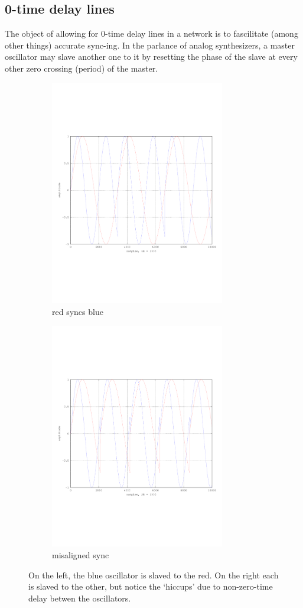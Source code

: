 \documentclass{article}
\begin{document}
\subsection{0-time delay lines}
The object of allowing for 0-time delay lines in a network is to fascilitate (among other things) accurate sync-ing. In the parlance of analog synthesizers, a master oscillator may slave another one to it by resetting the phase of the slave at every other zero crossing (period) of the master. 
\begin{figure}
  \centering
  
  \begin{subfigure}[b]{0.3\textwidth}
    \includegraphics[width=3in]{sync4}
    \caption{red syncs blue}
  \end{subfigure}
  
  \begin{subfigure}[b]{0.3\textwidth}
    \includegraphics[width=3in]{sync6}
    \caption{misaligned sync}
  \end{subfigure}
  \label{fig-syncs}\caption{On the left, the blue oscillator is slaved to the red. On the right each is slaved to the other, but notice the `hiccups' due to non-zero-time delay betwen the oscillators.}
\end{figure}
\end{document}
